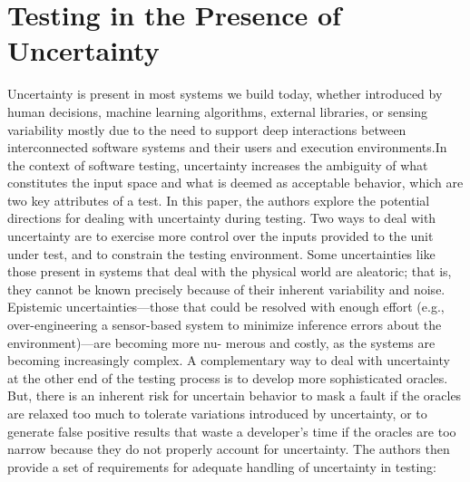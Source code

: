 \section{Testing in the Presence of Uncertainty}
Uncertainty is present in most systems we build today, whether introduced by human decisions, machine learning algorithms, external libraries, or sensing variability mostly due to the need to support deep interactions between interconnected software systems and their users and execution environments.In the context of software testing, uncertainty increases the ambiguity of what constitutes the input space and what is deemed as acceptable behavior, which are two key attributes of a test. In this paper, the authors explore the potential directions for dealing with uncertainty during testing.
Two ways to deal with uncertainty are to exercise more control over the inputs provided to the unit under test, and to constrain the testing environment. Some uncertainties like those present in systems that deal with the physical world are aleatoric; that is, they cannot be known precisely because of their inherent variability and noise. Epistemic uncertainties—those that could be resolved with enough effort (e.g., over-engineering a sensor-based system to minimize inference errors about the environment)—are becoming more nu- merous and costly, as the systems are becoming increasingly complex. A complementary way to deal with uncertainty at the other end of the testing process is to develop more sophisticated oracles. But, there is an inherent risk for uncertain behavior to mask a fault if the oracles are relaxed too much to tolerate variations introduced by uncertainty, or to generate false positive results that waste a developer’s time if the oracles are too narrow because they do not properly account for uncertainty. The authors then provide a set of requirements for adequate handling of uncertainty in testing:
